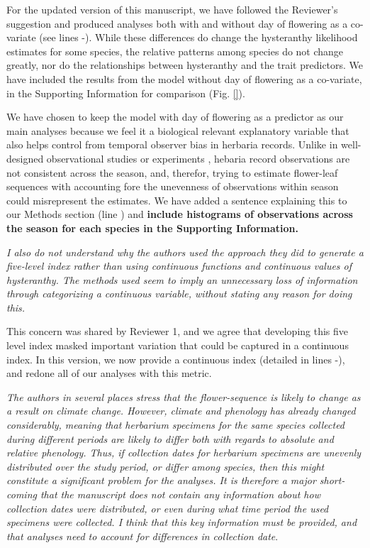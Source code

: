 \documentclass{article}[12pt]
\begin{document}
For the updated version of this manuscript, we  have followed the Reviewer's suggestion and produced analyses both with and without day of flowering as a co-variate (see lines -). While these differences do change the hysteranthy likelihood estimates for some species, the relative patterns among species do not change greatly, nor do the relationships between hysteranthy and the trait predictors. We have included the results from the model without day of flowering as a co-variate, in the Supporting Information for comparison (Fig. \ref{}).

We have chosen to keep the model with day of flowering as a predictor as our main analyses because we feel it a biological relevant explanatory variable that also helps control from temporal observer bias in herbaria records. Unlike in well-designed observational studies or experiments , hebaria record observations are not consistent across the season, and, therefor, trying to estimate flower-leaf sequences with accounting fore the unevenness of observations within season could misrepresent the estimates. We have added a sentence explaining this to our Methods section (line ) and \textbf{include histograms of observations across the season for each species in the Supporting Information.}


\emph{I also do not understand why the authors used the approach they did to generate a five-level index rather than using continuous functions and continuous values of hysteranthy. The methods used seem to imply an unnecessary loss of information through categorizing a continuous variable, without stating any reason for doing this.}

This concern was shared by Reviewer 1, and we agree that developing this five level index masked important variation that could be captured in a continuous index. In this version, we now provide a continuous index (detailed in lines -), and redone all of our analyses with this metric.

\emph{The authors in several places stress that the flower-sequence is likely to change as a result on climate change. However, climate and phenology has already changed considerably, meaning that herbarium specimens for the same species collected during different periods are likely to differ both with regards to absolute and relative phenology. Thus, if collection dates for herbarium specimens are unevenly distributed over the study period, or differ among species, then this might constitute a significant problem for the analyses. It is therefore a major short-coming that the manuscript does not contain any information about how collection dates were distributed, or even during what time period the used specimens were collected. I think that this key information must be provided, and that analyses need to account for differences in collection date}.
\end{document}
